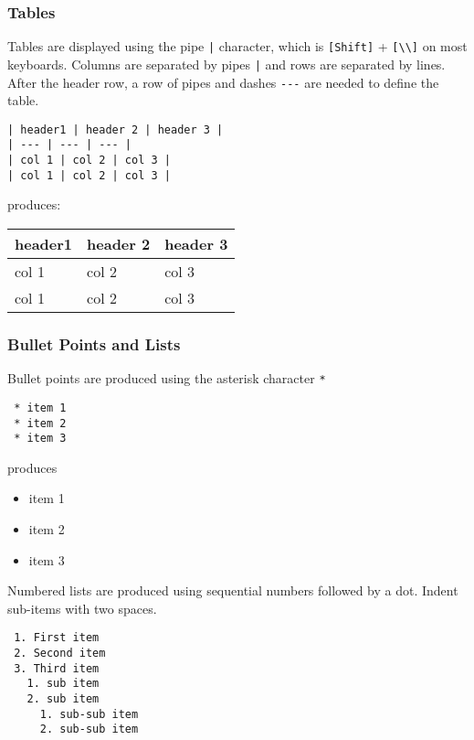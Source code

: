 \documentclass{book}
\providecommand{\tightlist}{%
      \setlength{\itemsep}{0pt}\setlength{\parskip}{0pt}}
\newcommand{\passthrough}[1]{#1}
\begin{document}
\hypertarget{tables}{%
\subsubsection{Tables}\label{tables}}

Tables are displayed using the pipe \passthrough{\lstinline!|!}
character, which is \passthrough{\lstinline![Shift]!} +
\passthrough{\lstinline![\\]!} on most keyboards. Columns are separated
by pipes \passthrough{\lstinline!|!} and rows are separated by lines.
After the header row, a row of pipes and dashes
\passthrough{\lstinline!---!} are needed to define the table.

\begin{lstlisting}
| header1 | header 2 | header 3 |
| --- | --- | --- |
| col 1 | col 2 | col 3 |
| col 1 | col 2 | col 3 |
\end{lstlisting}

produces:

\begin{longtable}[]{@{}lll@{}}
\toprule
header1 & header 2 & header 3\tabularnewline
\midrule
\endhead
col 1 & col 2 & col 3\tabularnewline
col 1 & col 2 & col 3\tabularnewline
\bottomrule
\end{longtable}

\hypertarget{bullet-points-and-lists}{%
\subsubsection{Bullet Points and Lists}\label{bullet-points-and-lists}}

Bullet points are produced using the asterisk character
\passthrough{\lstinline!*!}

\begin{lstlisting}
 * item 1
 * item 2
 * item 3
\end{lstlisting}

produces

\begin{itemize}
\tightlist
\item
  item 1
\item
  item 2
\item
  item 3
\end{itemize}

Numbered lists are produced using sequential numbers followed by a dot.
Indent sub-items with two spaces.

\begin{lstlisting}
 1. First item
 2. Second item
 3. Third item
   1. sub item
   2. sub item
     1. sub-sub item
     2. sub-sub item
\end{lstlisting}
\end{document}
